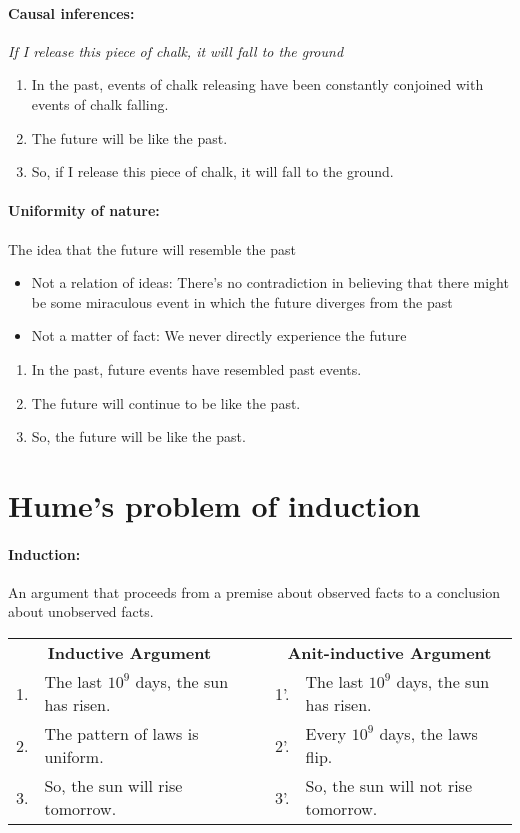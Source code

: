 \documentclass[10pt]{article}
\begin{document}
\paragraph{Causal inferences:} \textit{If I release this piece of chalk, it will fall to the ground}
\begin{enumerate}
 \item In the past, events of chalk releasing have been constantly conjoined with events of chalk falling.
 \item The future will be like the past.
 \item So, if I release this piece of chalk, it will fall to the ground.
\end{enumerate}

\paragraph{Uniformity of nature:} The idea that the future will resemble the past
\begin{itemize}
  \item Not a relation of ideas: There's no contradiction in believing that there might be some miraculous event in which the future diverges from the past
  \item Not a matter of fact: We never directly experience the future
\end{itemize}
 
\begin{enumerate}
 \item In the past, future events have resembled past events.
 \item The future will continue to be like the past.
 \item So, the future will be like the past.
\end{enumerate} 

\section{Hume's problem of induction}

\paragraph{Induction:} An argument that proceeds from a premise about observed facts to a conclusion about unobserved facts.

\begin{center}
\begin{tabular}{rl|crl}
\multicolumn{2}{c}{\textbf{Inductive Argument}} & & \multicolumn{2}{c}{\textbf{Anit-inductive Argument}} \\
1. & The last $10^9$ days, the sun has risen. & & 1'. & The last $10^9$ days, the sun has risen. \\
2. & The pattern of laws is uniform. & & 2'. & Every $10^9$ days, the laws flip. \\
3. & So, the sun will rise tomorrow. & & 3'. & So, the sun will not rise tomorrow. \\
\end{tabular}
\end{center}
\end{document}
